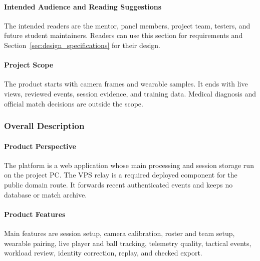 \paragraph{Intended Audience and Reading Suggestions}
The intended readers are the mentor, panel members, project team, testers, and
future student maintainers. Readers can use this section for requirements and
Section~\ref{sec:design_specifications} for their design.

\paragraph{Project Scope}
The product starts with camera frames and wearable samples. It ends with live
views, reviewed events, session evidence, and training data. Medical diagnosis
and official match decisions are outside the scope.

\subsubsection{Overall Description}

\paragraph{Product Perspective}
The platform is a web application whose main processing and session storage run
on the project PC. The VPS relay is a required deployed component for the public
domain route. It forwards recent authenticated events and keeps no database or
match archive.

\paragraph{Product Features}
Main features are session setup, camera calibration, roster and team setup,
wearable pairing, live player and ball tracking, telemetry quality, tactical
events, workload review, identity correction, replay, and checked export.


